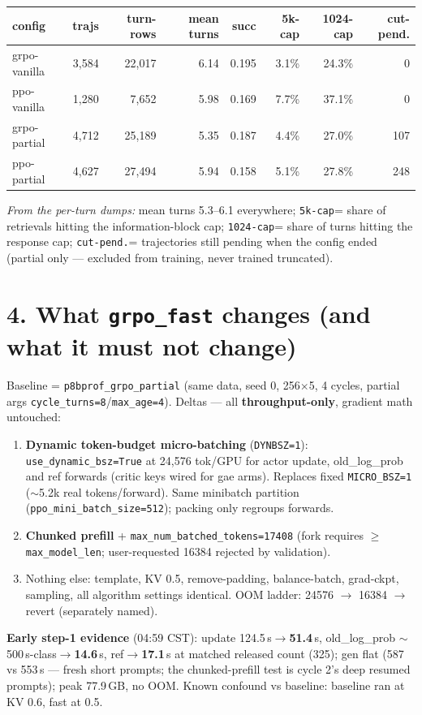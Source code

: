 \documentclass[10pt]{article}
\newcommand{\code}[1]{\texttt{\small #1}}
\begin{document}
\vspace{0.5em}
\begin{tabular}{lrrrrrrr}
\toprule
\textbf{config} & \textbf{trajs} & \textbf{turn-rows} & \textbf{mean turns} & \textbf{succ} & \textbf{5k-cap} & \textbf{1024-cap} & \textbf{cut-pend.}\\
\midrule
grpo-vanilla & 3,584 & 22,017 & 6.14 & 0.195 & 3.1\% & 24.3\% & 0 \\
ppo-vanilla & 1,280 & 7,652 & 5.98 & 0.169 & 7.7\% & 37.1\% & 0 \\
grpo-partial & 4,712 & 25,189 & 5.35 & 0.187 & 4.4\% & 27.0\% & 107 \\
ppo-partial & 4,627 & 27,494 & 5.94 & 0.158 & 5.1\% & 27.8\% & 248 \\
\bottomrule
\end{tabular}

\vspace{0.35em}\noindent
\emph{From the per-turn dumps:} mean turns 5.3--6.1 everywhere; \code{5k-cap}= share of
retrievals hitting the information-block cap; \code{1024-cap}= share of turns hitting the
response cap; \code{cut-pend.}= trajectories still pending when the config ended (partial
only --- excluded from training, never trained truncated).

\section*{4. What \code{grpo\_fast} changes (and what it must not change)}
Baseline = \code{p8bprof\_grpo\_partial} (same data, seed 0, 256$\times$5, 4 cycles, partial
args \code{cycle\_turns=8}/\code{max\_age=4}). Deltas --- all \textbf{throughput-only}, gradient
math untouched:
\begin{enumerate}
\item \textbf{Dynamic token-budget micro-batching} (\code{DYNBSZ=1}): \code{use\_dynamic\_bsz=True}
at 24{,}576 tok/GPU for actor update, old\_log\_prob and ref forwards (critic keys wired for
gae arms). Replaces fixed \code{MICRO\_BSZ=1} ($\sim$5.2k real tokens/forward). Same minibatch
partition (\code{ppo\_mini\_batch\_size=512}); packing only regroups forwards.
\item \textbf{Chunked prefill} + \code{max\_num\_batched\_tokens=17408} (fork requires
$\ge$\code{max\_model\_len}; user-requested 16384 rejected by validation).
\item Nothing else: template, KV 0.5, remove-padding, balance-batch, grad-ckpt, sampling,
all algorithm settings identical. OOM ladder: 24576 $\to$ 16384 $\to$ revert (separately named).
\end{enumerate}
\textbf{Early step-1 evidence} (04:59 CST): update 124.5\,s$\to$\textbf{51.4}\,s,
old\_log\_prob $\sim$500\,s-class$\to$\textbf{14.6}\,s, ref$\to$\textbf{17.1}\,s at matched
released count (325); gen flat (587 vs 553\,s --- fresh short prompts; the chunked-prefill
test is cycle 2's deep resumed prompts); peak 77.9\,GB, no OOM. Known confound vs baseline:
baseline ran at KV 0.6, fast at 0.5.
\end{document}

